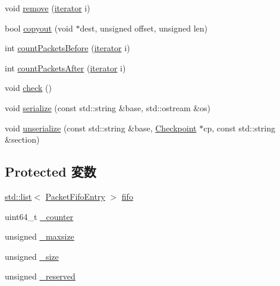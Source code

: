 \begin{DoxyCompactItemize}
void \hyperlink{classPacketFifo_a429e63f3d3384b4bb9e6514136c9e0f1}{remove} (\hyperlink{classPacketFifo_a6905b6d8863a2eecd86b633802b68fda}{iterator} i)
\item 
bool \hyperlink{classPacketFifo_a7848b43d10dbb281fedc589ae961c63f}{copyout} (void $\ast$dest, unsigned offset, unsigned len)
\item 
int \hyperlink{classPacketFifo_ac10df17121a3ec3c16e16de61b49df79}{countPacketsBefore} (\hyperlink{classPacketFifo_a6905b6d8863a2eecd86b633802b68fda}{iterator} i)
\item 
int \hyperlink{classPacketFifo_af8cc52fa26b81200af7971e0f495ee00}{countPacketsAfter} (\hyperlink{classPacketFifo_a6905b6d8863a2eecd86b633802b68fda}{iterator} i)
\item 
void \hyperlink{classPacketFifo_a83f8adca24e250bfb5c9a90a35503ae9}{check} ()
\item 
void \hyperlink{classPacketFifo_ab4138b21b48e3371a8e20df72b675a88}{serialize} (const std::string \&base, std::ostream \&os)
\item 
void \hyperlink{classPacketFifo_a147c320e3d6506edf5587a40cd8e430d}{unserialize} (const std::string \&base, \hyperlink{classCheckpoint}{Checkpoint} $\ast$cp, const std::string \&section)
\end{DoxyCompactItemize}
\subsection*{Protected 変数}
\begin{DoxyCompactItemize}
\item 
\hyperlink{classstd_1_1list}{std::list}$<$ \hyperlink{structPacketFifoEntry}{PacketFifoEntry} $>$ \hyperlink{classPacketFifo_a601f062a64a1985e834a57412003b514}{fifo}
\item 
uint64\_\-t \hyperlink{classPacketFifo_a0d911bb41364beca3cfb3bce20559fbd}{\_\-counter}
\item 
unsigned \hyperlink{classPacketFifo_aef977b2307374955129483eb55b7305e}{\_\-maxsize}
\item 
unsigned \hyperlink{classPacketFifo_a01c5535abb79f8abf8dc2658d7f768c7}{\_\-size}
\item 
unsigned \hyperlink{classPacketFifo_a9efa33fafbebfe72d86669a676327b51}{\_\-reserved}
\end{DoxyCompactItemize}


